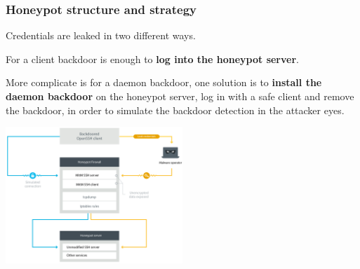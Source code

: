 \begin{frame}
	\frametitle{Honeypot structure and strategy}
	
	\footnotesize
	
  Credentials are leaked in two different ways.
  
  \smallskip

  For a client backdoor is enough to \textbf{log into the honeypot server}. 
  
  \smallskip

  More complicate is for a daemon backdoor, one solution is to \textbf{install the daemon backdoor} on the honeypot server, 
  log in with a safe client and remove the backdoor, in order to simulate the backdoor detection in the attacker eyes.

  \smallskip

  \begin{center}    
  \includegraphics[width=0.5\textwidth]{images/honeypot_infrastructure}
  \end{center}

\end{frame}


